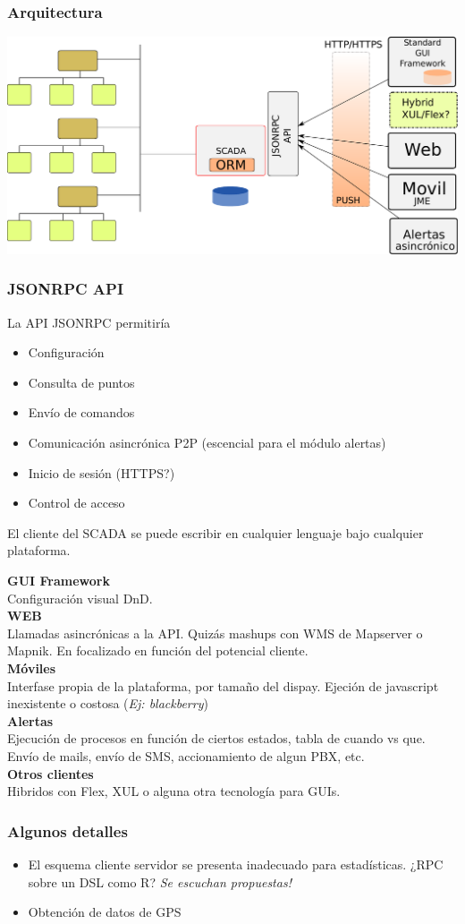 \documentclass{beamer}
\begin{document}
\begin{frame}
 \frametitle{Arquitectura}
  \begin{center}
   \includegraphics[scale=0.35]{arquitectura.pdf}
  \end{center}
\end{frame}
\begin{frame}
  \frametitle{JSONRPC API}
  La API JSONRPC permitiría
    \begin{itemize}
      \item Configuración 
      \item Consulta de puntos
      \item Envío de comandos
      \item Comunicación asincrónica P2P (escencial para el módulo alertas)
      \item Inicio de sesión (HTTPS?)
      \item Control de acceso
    \end{itemize}
  El cliente del SCADA se puede escribir en cualquier lenguaje bajo cualquier
  plataforma.
\end{frame}
\begin{frame}
  \textbf{GUI Framework}\\
  Configuración visual DnD.\\
  \textbf{WEB}\\
  Llamadas asincrónicas a la API. Quizás mashups con WMS de Mapserver o Mapnik.
  En focalizado en función del potencial cliente.
  \\
  \textbf{Móviles}\\
  Interfase propia de la plataforma, por tamaño del dispay. Ejeción de javascript
  inexistente o costosa (\emph{Ej: blackberry})\\
  \textbf{Alertas}\\
  Ejecución de procesos en función de ciertos estados, tabla de cuando vs que.
  Envío de mails, envío de SMS, accionamiento de algun PBX, etc.\\
  \textbf{Otros clientes}\\
  Hibridos con Flex, XUL o alguna otra tecnología para GUIs.
\end{frame}
\begin{frame}
 \frametitle{Algunos detalles}
  \begin{itemize}
    \item El esquema cliente servidor se presenta inadecuado para estadísticas.
      ¿RPC sobre un DSL como R? \emph{Se escuchan propuestas!}
    \item Obtención de datos de GPS
  \end{itemize}
\end{frame}
\end{document}
